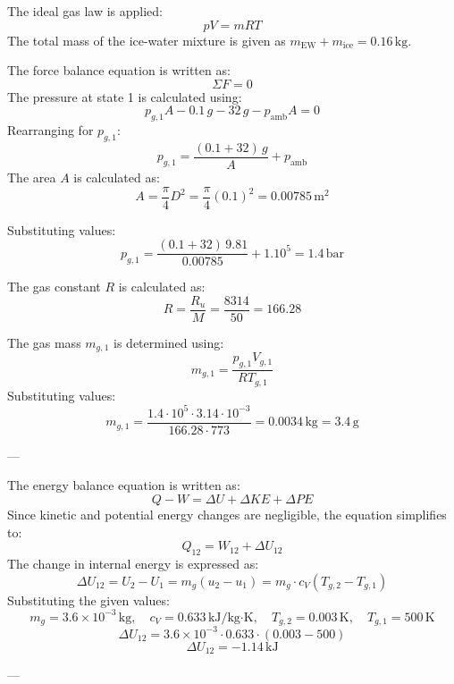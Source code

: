 The ideal gas law is applied:  
\[
pV = mRT
\]  
The total mass of the ice-water mixture is given as \( m_{\text{EW}} + m_{\text{ice}} = 0.16 \, \text{kg} \).  

The force balance equation is written as:  
\[
\Sigma F = 0
\]  
The pressure at state 1 is calculated using:  
\[
p_{g,1} A - 0.1 \, g - 32 \, g - p_{\text{amb}} A = 0
\]  
Rearranging for \( p_{g,1} \):  
\[
p_{g,1} = \frac{(0.1 + 32) \, g}{A} + p_{\text{amb}}
\]  
The area \( A \) is calculated as:  
\[
A = \frac{\pi}{4} D^2 = \frac{\pi}{4} (0.1)^2 = 0.00785 \, \text{m}^2
\]  

Substituting values:  
\[
p_{g,1} = \frac{(0.1 + 32) \, 9.81}{0.00785} + 1.10^5 = 1.4 \, \text{bar}
\]  

The gas constant \( R \) is calculated as:  
\[
R = \frac{R_u}{M} = \frac{8314}{50} = 166.28
\]  

The gas mass \( m_{g,1} \) is determined using:  
\[
m_{g,1} = \frac{p_{g,1} V_{g,1}}{R T_{g,1}}
\]  
Substituting values:  
\[
m_{g,1} = \frac{1.4 \cdot 10^5 \cdot 3.14 \cdot 10^{-3}}{166.28 \cdot 773} = 0.0034 \, \text{kg} = 3.4 \, \text{g}
\]  

---

The energy balance equation is written as:  
\[
Q - W = \Delta U + \Delta KE + \Delta PE
\]  
Since kinetic and potential energy changes are negligible, the equation simplifies to:  
\[
Q_{12} = W_{12} + \Delta U_{12}
\]  
The change in internal energy is expressed as:  
\[
\Delta U_{12} = U_2 - U_1 = m_g (u_2 - u_1) = m_g \cdot c_V (T_{g,2} - T_{g,1})
\]  
Substituting the given values:  
\[
m_g = 3.6 \times 10^{-3} \, \text{kg}, \quad c_V = 0.633 \, \text{kJ/kg·K}, \quad T_{g,2} = 0.003 \, \text{K}, \quad T_{g,1} = 500 \, \text{K}
\]  
\[
\Delta U_{12} = 3.6 \times 10^{-3} \cdot 0.633 \cdot (0.003 - 500)
\]  
\[
\Delta U_{12} = -1.14 \, \text{kJ}
\]  

---